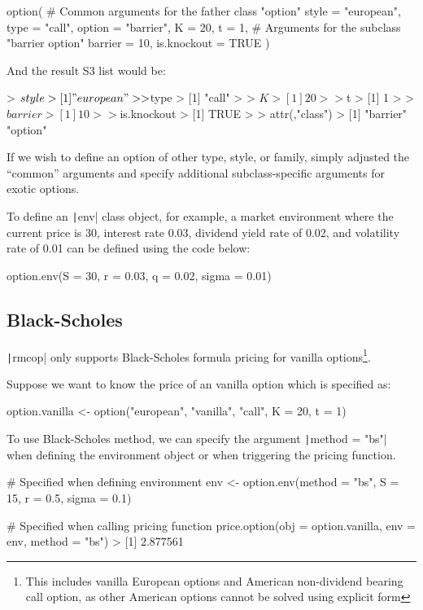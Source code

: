 \begin{Rminted}
option(
    # Common arguments for the father class "option"
    style = "european", type = "call", option = "barrier", K = 20, t = 1,
    # Arguments for the subclass "barrier option"
    barrier = 10, is.knockout = TRUE
)
\end{Rminted}

And the result S3 list would be:

\begin{Rminted}
> $style
> [1] "european"
> 
> $type
> [1] "call"
> 
> $K
> [1] 20
> 
> $t
> [1] 1
> 
> $barrier
> [1] 10
> 
> $is.knockout
> [1] TRUE
> 
> attr(,"class")
> [1] "barrier" "option" 
\end{Rminted}

If we wish to define an option of other type, style, or family, simply adjusted the ``common'' arguments and specify additional subclass-specific arguments for exotic options.

To define an \texttt|env| class object, for example, a market environment where the current price is 30, interest rate 0.03, dividend yield rate of 0.02, and volatility rate of 0.01 can be defined using the code below:

\begin{Rminted}
option.env(S = 30, r = 0.03, q = 0.02, sigma = 0.01)
\end{Rminted}

\subsection{Black-Scholes}

\texttt|rmcop| only supports Black-Scholes formula pricing for vanilla options\footnote{This includes vanilla European options and American non-dividend bearing call option, as other American options cannot be solved using explicit form}.

Suppose we want to know the price of an vanilla option which is specified as:

\begin{Rminted}
option.vanilla <- option("european", "vanilla", "call", K = 20, t = 1)
\end{Rminted}

To use Black-Scholes method, we can specify the argument \texttt|method = "bs"| when defining the environment object or when triggering the pricing function.

\begin{Rminted}
# Specified when defining environment
env <- option.env(method = "bs", S = 15, r = 0.5, sigma = 0.1)

# Specified when calling pricing function
price.option(obj = option.vanilla, env = env, method = "bs")
> [1] 2.877561
\end{Rminted}

